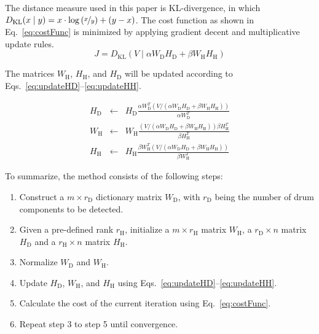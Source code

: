 \documentclass{article}
\begin{document}
The distance measure used in this paper is KL-divergence, in which \(D_\mathrm{KL}(x \mid y) = x\cdot\log\left(\nicefrac{x}{y}\right) + (y - x)\). %
The cost function as shown in Eq.~\eqref{eq:costFunc} is minimized by applying gradient decent and multiplicative update rules. 
\begin{equation}
\label{eq:costFunc}
J = D_\mathrm{KL}(V \mid \alpha W_\mathrm{D}H_\mathrm{D} + \beta W_\mathrm{H}H_\mathrm{H})
\end{equation}

The matrices  $W_\mathrm{H}$, $H_\mathrm{H}$, and $H_\mathrm{D}$ will be updated according to \mbox{Eqs.~\eqref{eq:updateHD}--\eqref{eq:updateHH}}.   

\begin{eqnarray}
\label{eq:updateHD}
H_\mathrm{D} &\leftarrow& H_\mathrm{D}\frac{\alpha W_\mathrm{D}^T( V / (\alpha W_\mathrm{D}H_\mathrm{D} + \beta W_\mathrm{H}H_\mathrm{H}))}{\alpha W_\mathrm{D}^T}\\
%
\label{eq:updateWH}
W_\mathrm{H} &\leftarrow& W_\mathrm{H}\frac{(V/(\alpha W_\mathrm{D}H_\mathrm{D} + \beta W_\mathrm{H}H_\mathrm{H})) \beta H_\mathrm{H}^T}{\beta H_\mathrm{H}^T}\\
%
\label{eq:updateHH}
H_\mathrm{H} &\leftarrow& H_\mathrm{H}\frac{\beta W_\mathrm{H}^T (V/(\alpha W_\mathrm{D}H_\mathrm{D} + \beta W_\mathrm{H}H_\mathrm{H}))}{\beta W_\mathrm{H}^T}
\end{eqnarray}

To summarize, the method consists of the following steps:
\begin{enumerate}
    \item   Construct a $m \times r_\mathrm{D}$ dictionary matrix $W_\mathrm{D}$, with $r_\mathrm{D}$ being the number of drum components to be detected.
    \item   Given a pre-defined rank $r_\mathrm{H}$, initialize a $m \times r_\mathrm{H}$ matrix $W_\mathrm{H}$, a $r_\mathrm{D} \times n$ matrix $H_\mathrm{D}$ and a $r_\mathrm{H} \times n$ matrix $H_\mathrm{H}$.
    \item   Normalize $W_\mathrm{D}$ and $W_\mathrm{H}$. 
    \item   Update $H_\mathrm{D}$, $W_\mathrm{H}$, and $H_\mathrm{H}$ using Eqs.~\eqref{eq:updateHD}--\eqref{eq:updateHH}.
    \item   Calculate the cost of the current iteration using Eq.~\eqref{eq:costFunc}.
    \item   Repeat step 3 to step 5 until convergence.
\end{enumerate}
\end{document}
